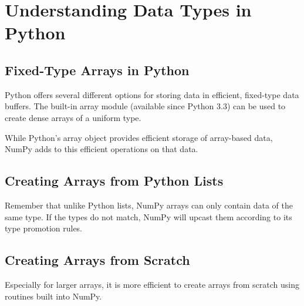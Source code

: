 \chapter{Understanding Data Types in Python}
\section{Fixed-Type Arrays in Python}
Python offers several different options for storing data in efficient, fixed-type data buffers. The built-in array module (available since Python 3.3) can be used to create dense arrays of a uniform type.

While Python's array object provides efficient storage of array-based data, NumPy adds to this efficient operations on that data.

\section{Creating Arrays from Python Lists}

Remember that unlike Python lists, NumPy arrays can only contain data of the same type. If the types do not match, NumPy will upcast them according to its type promotion rules.

\section{Creating Arrays from Scratch}
Especially for larger arrays, it is more efficient to create arrays from scratch using routines built into NumPy.
